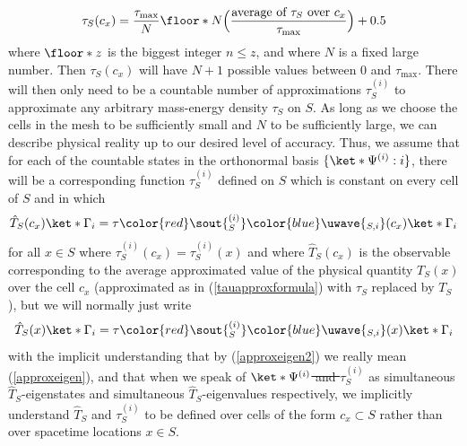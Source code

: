 \documentclass[12pt]{report}
\providecommand{\DIFadd}[1]{{\protect\color{blue}\uwave{#1}}} %
\providecommand{\DIFdel}[1]{{\protect\color{red}\sout{#1}}}                      %
\providecommand{\DIFaddbegin}{} %
\providecommand{\DIFaddend}{} %
\providecommand{\DIFdelbegin}{} %
\providecommand{\DIFdelend}{} %
\begin{document}
    \begin{equation}\label{tauapproxformula}
    \tau_S(c_x)=\frac{\tau_{\text{max}}}{N}\floor*{N\Big(\frac{\text{average of }\tau_S\text{ over }c_x}{\tau_{\text{max}}}\Big)+0.5}
    \end{equation}
    where $\floor*{z}$ is the biggest integer $n\leq z$, and where $N$ is a fixed large number. Then $\tau_S(c_x)$ will have $N+1$ possible values between $0$ and $\tau_{\text{max}}$.  There will then only need to be a countable number of approximations \DIFdelbegin \DIFdel{$\tau_S^{(i)}$ }\DIFdelend \DIFaddbegin \DIFadd{$\tau_{S,i}$ }\DIFaddend to approximate any arbitrary mass-energy density $\tau_S$ on $S$.  As long as we choose the cells in the mesh to be sufficiently small and $N$ to be sufficiently large, we can describe physical reality up to our desired level of accuracy. Thus, we assume that for each of the countable states in the orthonormal basis \DIFdelbegin \DIFdel{$\{\ket*{\Psi^{(i)}}:i\}$}\DIFdelend \DIFaddbegin \DIFadd{$\{\ket*{\Gamma_{i}}:i\in\mathbb{N}\}$}\DIFaddend , there will be a corresponding function \DIFdelbegin \DIFdel{$\tau_S^{(i)}$ }\DIFdelend \DIFaddbegin \DIFadd{$\tau_{S,i}$ }\DIFaddend defined on $S$ which is constant on every cell of $S$ and in which 
\begin{equation}\label{approxeigen}
\hat{T}_S(c_x)\DIFdelbegin %
\DIFdelend \DIFaddbegin \ket*{\Gamma_{i}}\DIFaddend = \tau\DIFdelbegin \DIFdel{_S^{(i)}}\DIFdelend \DIFaddbegin \DIFadd{_{S,i}}\DIFaddend (c_x)\DIFdelbegin %
\DIFdelend \DIFaddbegin \ket*{\Gamma_{i}}
\DIFaddend \end{equation} 
for all $x\in S$ where \DIFdelbegin \DIFdel{$ \tau_S^{(i)}(c_x)= \tau_S^{(i)}(x)$ }\DIFdelend \DIFaddbegin \DIFadd{$ \tau_{S,i}(c_x)= \tau_{S,i}(x)$ }\DIFaddend and where $\hat{T}_S(c_x)$ is the observable corresponding to the average approximated value of the physical quantity $T_S(x)$ over the cell $c_x$ (approximated as in (\ref{tauapproxformula}) with $\tau_S$ replaced by $T_S$), but we will normally just write
\begin{equation}\label{approxeigen2}
  \hat{T}_S(x)\DIFdelbegin %
\DIFdelend \DIFaddbegin \ket*{\Gamma_{i}}\DIFaddend = \tau\DIFdelbegin \DIFdel{_S^{(i)}}\DIFdelend \DIFaddbegin \DIFadd{_{S,i}}\DIFaddend (x)\DIFdelbegin %
\DIFdelend \DIFaddbegin \ket*{\Gamma_{i}}
  \DIFaddend \end{equation}
with the implicit understanding that by (\ref{approxeigen2}) we really mean (\ref{approxeigen}), and that when we speak of \DIFdelbegin \DIFdel{$\ket*{\Psi^{(i)}}$ and $\tau_S^{(i)}$ }\DIFdelend \DIFaddbegin \DIFadd{$\ket*{\Gamma_{i}}$ and $\tau_{S,i}$ }\DIFaddend as simultaneous $\hat{T}_S$-eigenstates and simultaneous $\hat{T}_S$-eigenvalues respectively, we implicitly understand $\hat{T}_S$ and \DIFdelbegin \DIFdel{$\tau_S^{(i)}$ }\DIFdelend \DIFaddbegin \DIFadd{$\tau_{S,i}$ }\DIFaddend to be defined over cells of the form $c_x\subset S$ rather than over spacetime locations $x\in S$.
\end{document}
